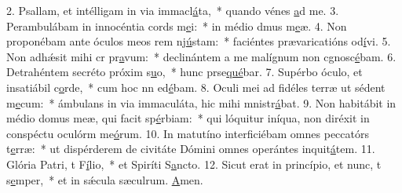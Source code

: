 2. Psallam, et intélligam in via immacl\uline{á}ta,~* quando vénes \uline{a}d me.
3. Perambulábam in innocéntia cords m\uline{e}i:~* in médio dmus m\uline{e}æ.
4. Non proponébam ante óculos meos rem nj\uline{ú}stam:~* faciéntes prævaricatións od\uline{í}vi.
5. Non adhǽsit mihi cr pr\uline{a}vum:~* declinántem a me malígnum non cgnosc\uline{é}bam.
6. Detrahéntem secréto próxim s\uline{u}o,~* hunc prse\uline{qué}bar.
7. Supérbo óculo, et insatiábil c\uline{o}rde,~* cum hoc nn ed\uline{é}bam.
8. Oculi mei ad fidéles terræ ut sédent m\uline{e}cum:~* ámbulans in via immaculáta, hic mihi mnistr\uline{á}bat.
9. Non habitábit in médio domus meæ, qui facit sp\uline{é}rbiam:~* qui lóquitur iníqua, non diréxit in conspéctu oculórm me\uline{ó}rum.
10. In matutíno interficiébam omnes peccatórs t\uline{e}rræ:~* ut dispérderem de civitáte Dómini omnes operántes inquit\uline{á}tem.
11. Glória Patri, t F\uline{í}lio,~* et Spiríti S\uline{a}ncto.
12. Sicut erat in princípio, et nunc, t s\uline{e}mper,~* et in sǽcula sæculrum. \uline{A}men.
